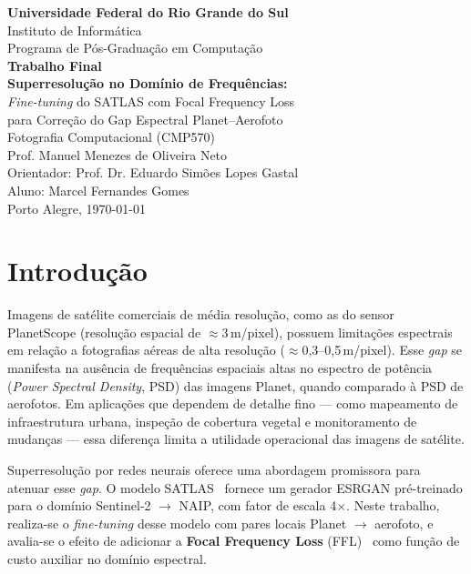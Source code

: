 \documentclass[12pt, a4paper]{article}
\begin{document}
\begin{titlepage}
    \centering
    \vspace*{2cm}
    {\Large\textbf{Universidade Federal do Rio Grande do Sul}}\\
    {\large Instituto de Informática}\\
    {\large Programa de Pós-Graduação em Computação}\\[2cm]
    {\LARGE\textbf{Trabalho Final}}\\[0.5cm]
    {\Large\textbf{Superresolução no Domínio de Frequências:}}\\[0.3cm]
    {\Large\textit{Fine-tuning} do SATLAS com Focal Frequency Loss\\
    para Correção do Gap Espectral Planet--Aerofoto}\\[1.5cm]
    {\large Fotografia Computacional (CMP570)}\\
    {\large Prof. Manuel Menezes de Oliveira Neto}\\
    {\large Orientador: Prof. Dr. Eduardo Simões Lopes Gastal}\\[3cm]
    {\large Aluno: Marcel Fernandes Gomes}\\
    {\large Porto Alegre, \today}
\end{titlepage}

\section{Introdução}

Imagens de satélite comerciais de média resolução, como as do sensor PlanetScope
(resolução espacial de $\approx$3\,m/pixel), possuem limitações espectrais em
relação a fotografias aéreas de alta resolução ($\approx$0{,}3--0{,}5\,m/pixel).
Esse \textit{gap} se manifesta na ausência de frequências espaciais altas no
espectro de potência (\textit{Power Spectral Density}, PSD) das imagens Planet,
quando comparado à PSD de aerofotos. Em aplicações que dependem de detalhe fino
--- como mapeamento de infraestrutura urbana, inspeção de cobertura vegetal e
monitoramento de mudanças --- essa diferença limita a utilidade operacional das
imagens de satélite.

Superresolução por redes neurais oferece uma abordagem promissora para atenuar
esse \textit{gap}. O modelo SATLAS~\cite{satlas} fornece um gerador ESRGAN
pré-treinado para o domínio Sentinel-2 $\rightarrow$ NAIP, com fator de escala
4$\times$. Neste trabalho, realiza-se o \textit{fine-tuning} desse modelo com
pares locais Planet $\rightarrow$ aerofoto, e avalia-se o efeito de adicionar
a \textbf{Focal Frequency Loss} (FFL)~\cite{ffl} como função de custo auxiliar
no domínio espectral.
\end{document}

